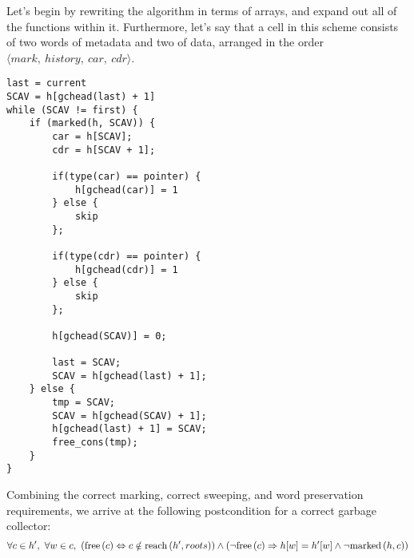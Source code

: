 Let's begin by rewriting the algorithm in terms of arrays, and expand
out all of the functions within it. Furthermore, let's say that a cell
in this scheme consists of two words of metadata and two of data,
arranged in the order $\langle mark,\ history,\ car,\ cdr \rangle$.

\begin{lstlisting}
last = current
SCAV = h[gchead(last) + 1]
while (SCAV != first) {
    if (marked(h, SCAV)) {
        car = h[SCAV];
        cdr = h[SCAV + 1];

        if(type(car) == pointer) {
            h[gchead(car)] = 1
        } else {
            skip
        };

        if(type(cdr) == pointer) {
            h[gchead(cdr)] = 1
        } else {
            skip
        };

        h[gchead(SCAV)] = 0;

        last = SCAV;
        SCAV = h[gchead(last) + 1];
    } else {
        tmp = SCAV;
        SCAV = h[gchead(SCAV) + 1];
        h[gchead(last) + 1] = SCAV;
        free_cons(tmp);
    }
}
\end{lstlisting}

Combining the correct marking, correct sweeping, and word preservation
requirements, we arrive at the following postcondition for a correct
garbage collector: \[\forall c \in h',\ \forall w \in c,\
(\mathrm{free}\left(c\right) \Leftrightarrow c \notin \mathrm{reach}\left(h', roots\right)) \land (\lnot\mathrm{free}\left(c\right) \Rightarrow
h[w] = h'[w] \land \lnot\mathrm{marked}\left(h, c\right))\]

